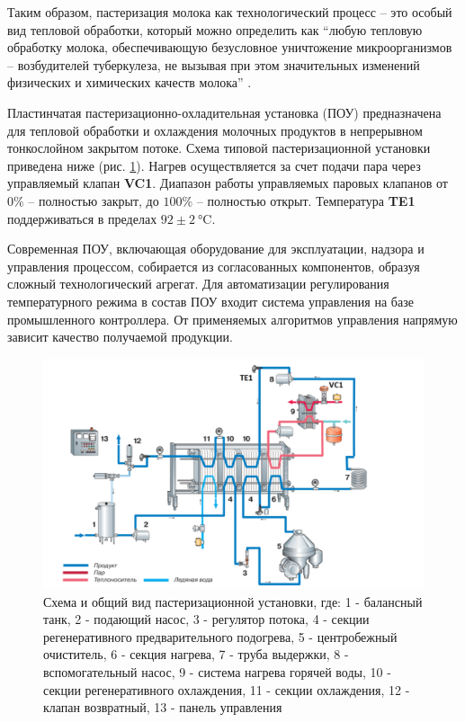 Таким образом, пастеризация молока как технологический процесс – это особый вид тепловой обработки, который можно определить как “любую тепловую обработку молока, обеспечивающую безусловное уничтожение микроорганизмов – возбудителей туберкулеза, не вызывая при этом значительных изменений физических и химических качеств молока” \cite{TetraPak1995}.

Пластинчатая пастеризационно-охладительная установка (ПОУ) предназначена для тепловой обработки и охлаждения молочных продуктов в непрерывном тонкослойном закрытом потоке. Схема типовой пастеризационной установки приведена ниже (рис. \ref{fig:POU_Tetra_Pak}). Нагрев осуществляется за счет подачи пара через управляемый клапан \textbf{VC1}. Диапазон работы управляемых паровых клапанов от $\text{0\%}$ – полностью закрыт, до $\text{100\%}$ – полностью открыт. Температура \textbf{TE1} поддерживаться в пределах $92 \pm 2 \SI{}{\celsius}$.

Современная ПОУ, включающая оборудование для эксплуатации, надзора и управления процессом, собирается из согласованных компонентов, образуя сложный технологический агрегат. Для автоматизации регулирования температурного режима в состав ПОУ входит система управления на базе промышленного контроллера. От применяемых алгоритмов управления напрямую зависит качество получаемой продукции.

\begin{figure}[H]
    \centering
    \includegraphics[width=\textwidth]{images/chapter_2/ПОУ Tetra Pak.png}
    \caption{Схема и общий вид пастеризационной установки, где: 1 - балансный танк, 2 - подающий насос, 3 - регулятор потока, 4 - секции регенеративного предварительного подогрева, 5 - центробежный очиститель, 6 - секция нагрева, 7 - труба выдержки, 8 - вспомогательный насос, 9 - система нагрева горячей воды, 10 - секции регенеративного охлаждения, 11 - секции охлаждения, 12 - клапан возвратный, 13 - панель управления}
    \label{fig:POU_Tetra_Pak}
\end{figure}

